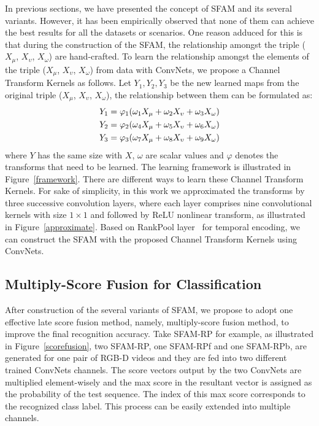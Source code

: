 \documentclass[10pt,twocolumn,letterpaper]{article}
\begin{document}
In previous sections, we have presented the concept of SFAM and its several 
variants. 
However, it has been empirically observed that none of them can achieve the best 
results for all the datasets or scenarios. One reason adduced for this is 
that during the construction of the SFAM, the relationship amongst the triple 
($X_{\mu}$, $X_{\upsilon}$, $X_{\omega}$) are hand-crafted.  To learn the 
relationship amongst the elements of the triple ($X_{\mu}$, $X_{\upsilon}$, 
$X_{\omega}$) from data with ConvNets, we propose a Channel Transform Kernels 
as follows. 
Let $Y_{1}, Y_{2}, Y_{3}$ be the new learned maps from the original 
triple ($X_{\mu}$, $X_{\upsilon}$, $X_{\omega}$), the relationship between them 
can be formulated as:
\begin{gather}
Y_{1} = \varphi_{1}(\omega_{1}X_{\mu} + \omega_{2}X_{\upsilon} + \omega_{3}X_{\omega}) \notag\\
Y_{2} = \varphi_{2}(\omega_{4}X_{\mu} + \omega_{5}X_{\upsilon} + \omega_{6}X_{\omega}) \\\label{relation} 
Y_{3} = \varphi_{3}(\omega_{7}X_{\mu} + \omega_{8}X_{\upsilon} + \omega_{9}X_{\omega})\notag
\end{gather}
where $Y$ has the same size with $X$, $\omega$ are scalar values and $\varphi$ 
denotes the transforms that need to be learned. The learning framework is 
illustrated in Figure~\ref{framework}. There are different ways to learn these 
Channel Transform Kernels. For sake of simplicity, in this work we approximated 
the transforms by three successive convolution layers, where each layer 
comprises nine convolutional kernels with size $1 \times 1$ and followed by 
ReLU nonlinear transform, as illustrated in Figure~\ref{approximate}. Based on 
RankPool layer~\cite{bilen2016dynamic} for temporal encoding, we can construct 
the SFAM with the proposed Channel Transform Kernels using ConvNets.

\subsection{Multiply-Score Fusion for Classification}
After construction of the several variants of SFAM, we propose to adopt one 
effective late score fusion method, namely, multiply-score fusion method, to 
improve the final recognition accuracy. 
Take SFAM-RP for example,  as illustrated in Figure~\ref{scorefusion}, two 
SFAM-RP, one SFAM-RPf and one SFAM-RPb, are generated for one pair of RGB-D videos 
and they are fed into two different trained ConvNets channels. The score 
vectors output by the two ConvNets are multiplied element-wisely  and 
the max score in the resultant vector is assigned as the probability of the 
test sequence. The index of this max score corresponds to the recognized class 
label. This process can be easily extended into multiple channels.
\end{document}
